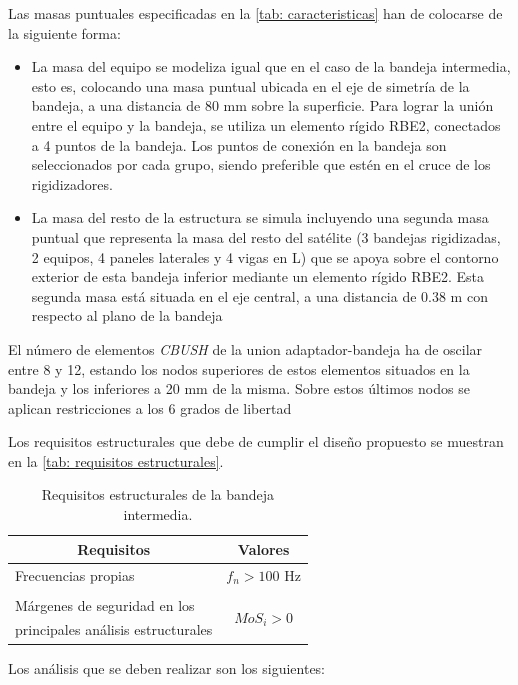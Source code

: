 Las masas puntuales especificadas en la \autoref{tab: caracteristicas} han de colocarse de la siguiente forma:
\begin{itemize}
\item La masa del equipo se modeliza igual que en el caso de la bandeja intermedia, esto es, colocando una masa puntual ubicada en el eje de simetría de la bandeja, a una distancia de 80 mm sobre la superficie. Para lograr la unión entre el equipo y la bandeja, se utiliza un elemento rígido RBE2, conectados a 4 puntos de la bandeja. Los puntos de conexión en la bandeja son seleccionados por cada grupo, siendo preferible que estén en el cruce de los rigidizadores.
\item La masa del resto de la estructura se simula incluyendo una segunda masa puntual que representa la masa del resto del satélite (3 bandejas rigidizadas, 2 equipos, 4 paneles laterales y 4 vigas en L) que se apoya sobre el contorno exterior de esta bandeja inferior mediante un elemento rígido RBE2. Esta segunda masa está situada en el eje central, a una distancia de 0.38 m con respecto al plano de la bandeja
\end{itemize}

El número de elementos \textit{CBUSH} de la union adaptador-bandeja ha de oscilar entre 8 y 12, estando los nodos superiores de estos elementos situados en la bandeja y los inferiores a 20 mm de la misma. Sobre estos últimos nodos se aplican restricciones a los 6 grados de libertad 

Los requisitos estructurales que debe de cumplir el diseño propuesto se muestran en la \autoref{tab: requisitos estructurales}.

\begin{table}[H]
\centering
\caption{Requisitos estructurales de la bandeja intermedia.}
\label{tab: requisitos estructurales}
\begin{tabular}{l c}
\toprule
\multicolumn{1}{c}{\textbf{Requisitos}} & \multicolumn{1}{c}{\textbf{Valores}}\\ \midrule
 Frecuencias propias & $f_{n} > 100$ Hz \\ 
 & \\
 Márgenes de seguridad en los & \multirow{2}{*}{$MoS_{i}>0$} \\ 
 principales análisis estructurales & \\\bottomrule
\end{tabular}
\end{table}

Los análisis que se deben realizar son los siguientes:

